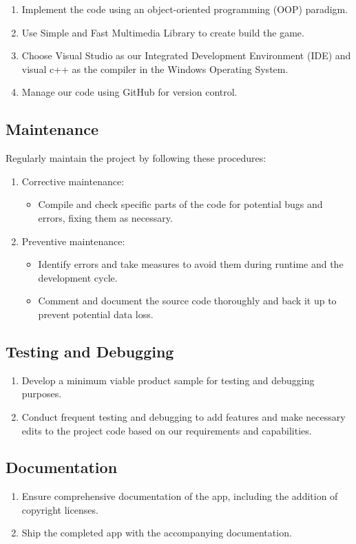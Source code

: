 	\begin{enumerate}
		
		\item Implement the code using an object-oriented programming (OOP) paradigm. 
		\item Use Simple and Fast Multimedia Library to create build the game.
		\item Choose Visual Studio as our Integrated Development Environment (IDE) and visual c++ as the compiler in the Windows Operating System.
		\item Manage our code using GitHub for version control.
		
	\end{enumerate}
	
 \subsection{Maintenance}
	Regularly maintain the project by following these procedures:
	\begin{enumerate}
		
		\item Corrective maintenance:
		\begin{itemize}
			\item Compile and check specific parts of the code for potential bugs and errors, fixing them as necessary.
		\end{itemize}
		\pagebreak
		\item  Preventive maintenance:
		\begin{itemize}
			
			\item Identify errors and take measures to avoid them during runtime and the development cycle.
			\item Comment and document the source code thoroughly and back it up to prevent potential data loss.
			
			
		\end{itemize}
	\end{enumerate}

	\subsection{Testing and Debugging}
	\begin{enumerate}
		
		\item Develop a minimum viable product sample for testing and debugging purposes.
		\item Conduct frequent testing and debugging to add features and make necessary edits to the project code based on our requirements and capabilities.
		
	\end{enumerate}
	\subsection{ Documentation}
	\begin{enumerate}
		\item Ensure comprehensive documentation of the app, including the addition of copyright licenses.
		\item Ship the completed app with the accompanying documentation.
	\end{enumerate}


\newpage


